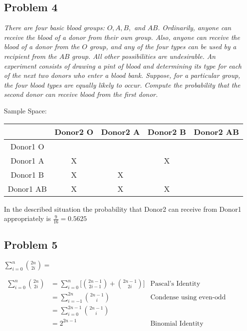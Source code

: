 \documentclass[a4paper,man,natbib]{apa6}
\begin{document}
\subsection{Problem 4}
\emph{There are four basic blood groups: $O, A, B,$ and $AB$. 
	Ordinarily, anyone can receive the blood of a donor from their own group. Also, anyone can receive the blood of a donor from the $O$ group, and any of the four types can be used by a recipient from the $AB$ group. All other possibilities are undesirable. An experiment consists of drawing a pint of blood and determining its type for each of the next two donors who enter a blood bank. Suppose, for a particular group, the four blood types are equally likely to occur. Compute the probability that the second donor can receive blood from the first donor.} \vspace{1em}

Sample Space: \\
\begin{tabular}{|c|c|c|c|c|}
	\hline
	& Donor2 O & Donor2 A & Donor2 B & Donor2 AB \\
	\hline Donor1 O   & \checkmark &  \checkmark & \checkmark  & \checkmark \\
	\hline Donor1 A   & X & \checkmark  & X & \checkmark \\
	\hline Donor1 B   & X & X & \checkmark  & \checkmark  \\
	\hline Donor1 AB & X  & X & X &  \checkmark  \\
	\hline
\end{tabular}

	In the described situation the probability that Donor2 can receive from Donor1 appropriately is
	$\frac{9}{16} = 0.5625$

\subsection{Problem 5}
\emph{  $\sum_{i=0}^{n} \binom{2n}{2i} =$  }\vspace{1em}

\begin{align*}
	\sum_{i=0}^{n}\binom{2n}{2i}
	&= \sum_{i=0}^{n}\bigg[ \binom{2n-1}{2i-1}+\binom{2n-1}{2i} \bigg] &\text{Pascal's Identity}\\
	&= \sum_{i=-1}^{2n}\binom{2n-1}{i}  & \text{Condense using even-odd summation}\\
	&= \sum_{i=0}^{2n-1}\binom{2n-1}{i}  &\\
	&= 2^{2n-1}  &\text{Binomial Identity}
\end{align*}
\end{document}
